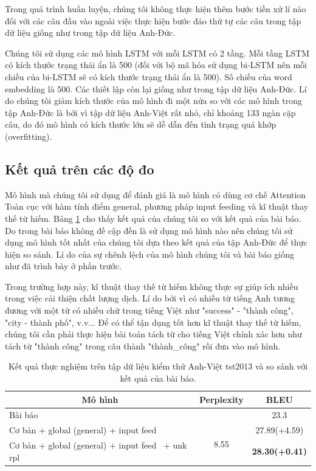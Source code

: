 Trong quá trình huấn luyện, chúng tôi không thực hiện thêm bước tiền xử lí nào đối với các câu đầu vào ngoài việc thực hiện bước đảo thứ tự các câu trong tập dữ liệu giống như trong tập dữ liệu Anh-Đức.

Chúng tôi sử dụng các mô hình LSTM với mỗi LSTM có 2 tầng. Mỗi tầng LSTM có kích thước trạng thái ẩn là 500 (đối với bộ mã hóa sử dụng bi-LSTM nên mỗi chiều của bi-LSTM sẽ có kích thước trạng thái ẩn là 500). Số chiều của word embedding là 500. Các thiết lập còn lại giống như trong tập dữ liệu Anh-Đức. Lí do chúng tôi giảm kích thước của mô hình đi một nửa so với các mô hình trong tập Anh-Đức là bởi vì tập dữ liệu Anh-Việt rất nhỏ, chỉ khoảng 133 ngàn cặp câu, do đó mô hình có kích thước lớn sẽ dễ dẫn đến tình trạng quá khớp (overfitting).

\subsection{Kết quả trên các độ đo}

Mô hình mà chúng tôi sử dụng để đánh giá là mô hình có dùng cơ chế Attention Toàn cục với hàm tính điểm general, phương pháp input feeding và kĩ thuật thay thế từ hiếm. Bảng \ref{tab_en-vi_results} cho thấy kết quả của chúng tôi so với kết quả của bài báo. Do trong bài báo \cite{AnhVietpaper} không đề cập đến là sử dụng mô hình nào nên chúng tôi sử dụng mô hình tốt nhất của chúng tôi dựa theo kết quả của tập Anh-Đức để thực hiện so sánh. Lí do của sự chênh lệch của mô hình chúng tôi và bài báo giống như đã trình bày ở phần trước.

Trong trường hợp này, kĩ thuật thay thế từ hiếm không thực sự giúp ích nhiều trong việc cải thiện chất lượng dịch. Lí do bởi vì có nhiều từ tiếng Anh tương đương với một từ có nhiều chữ trong tiếng Việt như "success" - "thành công", "city - thành phố", v.v... Để có thể tận dụng tốt hơn kĩ thuật thay thế từ hiếm, chúng tôi cần phải thực hiện bài toán tách từ cho tiếng Việt chính xác hơn như tách từ "thành công" trong câu thành "thành\_công" rồi đưa vào mô hình.



\begin{table}
	\centering
	\caption{Kết quả thực nghiệm trên tập dữ liệu kiểm thử Anh-Việt tst2013 và so sánh với kết quả của bài báo.}
	\begin{tabular}{|l|c|c|} 
		\hline
		\multicolumn{1}{|c|}{ \textbf{Mô hình} }          & \textbf{Perplexity}   & \textbf{BLEU}                               \\ 
		\hline
		Bài báo                                           &                       & 23.3                                        \\ 
		\hline
		Cơ bản + global (general) + input feed~           & \multirow{2}{*}{8.55} & 27.89(+4.59)                                \\ 
		\cline{1-1}\cline{3-3}
		Cơ bản + global (general) + input feed~ + unk rpl &                       & \multicolumn{1}{l|}{\textbf{28.30(+0.41)}}  \\
		\hline
	\end{tabular}
	\label{tab_en-vi_results}
\end{table}

